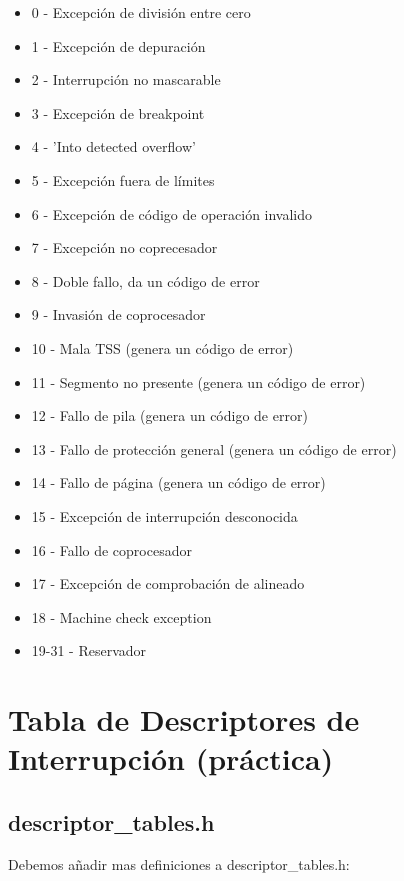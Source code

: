 \documentclass{report}
\begin{document}
\begin{itemize}
	\item 0 - Excepción de división entre cero
	\item 1 - Excepción de depuración
	\item 2 - Interrupción no mascarable
	\item 3 - Excepción de breakpoint
	\item 4 - 'Into detected overflow'
	\item 5 - Excepción fuera de límites
	\item 6 - Excepción de código de operación invalido
	\item 7 - Excepción no coprecesador
	\item 8 - Doble fallo, da un código de error
	\item 9 - Invasión  de coprocesador
	\item 10 - Mala TSS (genera un código de error)
	\item 11 - Segmento no presente (genera un código de error)
	\item 12 - Fallo de pila (genera un código de error)
	\item 13 - Fallo de protección general (genera un código de error)
	\item 14 - Fallo de página (genera un código de error)
	\item 15 - Excepción de interrupción desconocida
	\item 16 - Fallo de coprocesador
	\item 17 - Excepción de comprobación de alineado
	\item 18 - Machine check exception
	\item 19-31 - Reservador
	
\end{itemize}

\section{Tabla de Descriptores de Interrupción (práctica)}

\subsection{descriptor\_tables.h}

Debemos añadir mas definiciones a  descriptor\_tables.h:
\end{document}
